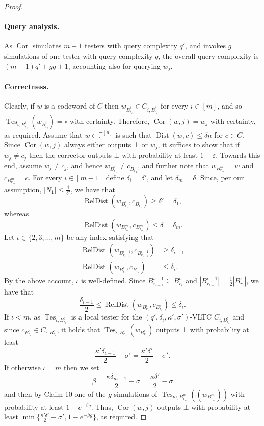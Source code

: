 \documentclass[10pt,a4paper]{article}
\begin{document}
\begin{proof}
\paragraph{Query analysis.} As $\operatorname{Cor}$ simulates $m-1$ testers with query complexity $q'$, and invokes $g$ simulations of one tester with query complexity $q$, the overall query complexity is $(m-1)q'+gq+1$, accounting also for querying $w_j$.
\paragraph{Correctness.} Clearly, if $w$ is a codeword of $C$ then $w_{B_{r_i}^i}\in C_{i,B_{r_i}^i}$ for every $i\in[m]$, and so $\operatorname{Tes}_{i,B_{r_i}^i}(w_{B_{r_i}^i})=\circ$ with certainty. Therefore, $\operatorname{Cor}(w,j)=w_j$ with certainty, as required.
Assume that $w\in\mathbb F^{[n]}$ is such that $\operatorname{Dist}(w,c)\le\delta n$ for $c\in C$. Since $\operatorname{Cor}(w,j)$ always either outputs $\bot$ or $w_j$, it suffices to show that if $w_j\ne c_j$ then the corrector outputs $\bot$ with probability at least $1-\varepsilon$. Towards this end, assume $w_j\ne c_j$, and hence $w_{B_{r_1}^1}\ne c_{B_{r_1}^1}$, and further note that $w_{B_{r_m}^m}=w$ and $c_{B_{r_m}^m}=c$. For every $i\in[m-1]$ define $\delta_i=\delta'$, and let $\delta_m=\delta$. Since, per our assumption, $|N_1|\le\frac1{\delta'}$, we have that
\[\operatorname{RelDist}(w_{B_{r_1}^1},c_{B_{r_1}^1})\ge\delta'=\delta_1,\]
whereas
\[\operatorname{RelDist}(w_{B_{r_m}^m},c_{B_{r_m}^m})\le\delta=\delta_m.\]
Let $\iota\in\{2,3,\ldots,m\}$ be any index satisfying that
\begin{align*}\operatorname{RelDist}(w_{B_{r_{\iota-1}}^{\iota-1}},c_{B_{r_{\iota-1}}^{\iota-1}})&\ge\delta_{\iota-1}\\\operatorname{RelDist}(w_{B_{r_\iota}^\iota},c_{B_{r_\iota}^\iota})&\le\delta_\iota.\end{align*}
By the above account, $\iota$ is well-defined. Since $B_{r_{\iota-1}}^{\iota-1}\subseteq B_{r_\iota}^\iota$ and $|B_{r_{\iota-1}}^{\iota-1}|=\frac12|B_{r_\iota}^\iota|$, we have that
\[\frac{\delta_{\iota-1}}2\le\operatorname{RelDist}(w_{B_{r_\iota}^\iota},c_{B_{r_\iota}^\iota})\le\delta_\iota.\]
If $\iota<m$, as $\operatorname{Tes}_{\iota,B_{r_\iota}^\iota}$ is a local tester for the $(q',\delta_\iota,\kappa',\sigma')$-VLTC $C_{i,B_{r_\iota}^\iota}$ and since $c_{B_{r_\iota}^\iota}\in C_{\iota,B_{r_\iota}^\iota}$, it holds that $\operatorname{Tes}_{\iota,B_{r_\iota}^\iota}(w_{B_{r_\iota}^\iota})$ outputs $\bot$ with probability at least
\[\frac{\kappa'\delta_{\iota-1}}2-\sigma'=\frac{\kappa'\delta'}2-\sigma'.\]
If otherwise $\iota=m$ then we set
\[\beta=\frac{\kappa\delta_{m-1}}2-\sigma=\frac{\kappa\delta'}2-\sigma\]
and then by Claim 10 one of the $g$ simulations of $\operatorname{Tes}_{m,B_{r_m}^m}((w_{B_{r_m}^m}))$ with probability at least $1-e^{-\beta g}$. Thus, $\operatorname{Cor}(w,j)$ outputs $\bot$ with probability at least $\min\{\frac{\kappa'\delta'}2-\sigma',1-e^{-\beta g}\}$, as required.
\end{proof}
\end{document}
